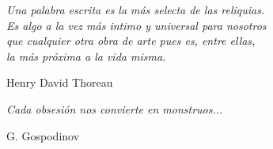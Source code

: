\thispagestyle{empty}

\vspace*{\fill}
\begin{flushright}

\textit{Una palabra escrita es la más selecta de las reliquias.\\
Es algo a la vez más intimo y universal para nosotros \\
que cualquier otra obra de arte pues es, entre ellas,\\ 
la más próxima a la vida misma.\\}

Henry David Thoreau

\vspace{0.5cm}

\textit{Cada obsesión nos convierte en monstruos...}

G. Gospodinov



\end{flushright}

\vspace*{\fill}
\clearpage